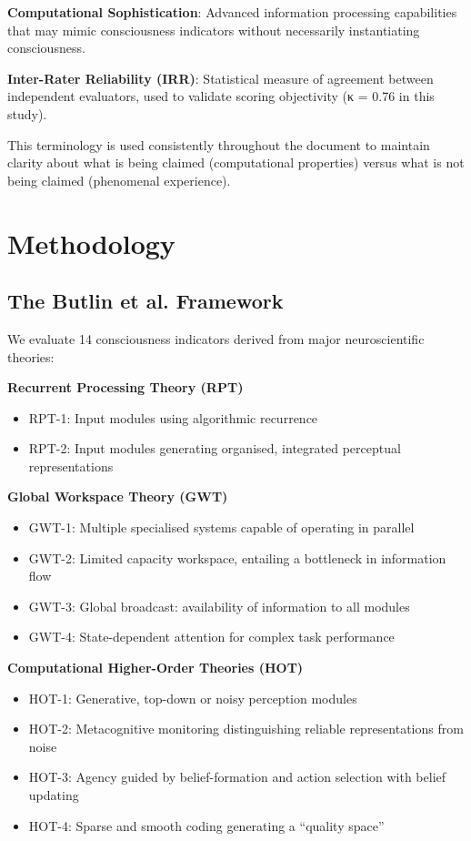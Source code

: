 \documentclass[12pt,a4paper]{article}
\begin{document}
\textbf{Computational Sophistication}: Advanced information processing capabilities that may mimic consciousness indicators without necessarily instantiating consciousness.

\textbf{Inter-Rater Reliability (IRR)}: Statistical measure of agreement between independent evaluators, used to validate scoring objectivity (κ = 0.76 in this study).

This terminology is used consistently throughout the document to maintain clarity about what is being claimed (computational properties) versus what is not being claimed (phenomenal experience).

\section{Methodology}

\subsection{The Butlin et al. Framework}

We evaluate 14 consciousness indicators derived from major neuroscientific theories:

\textbf{Recurrent Processing Theory (RPT)}
\begin{itemize}
    \item RPT-1: Input modules using algorithmic recurrence
    \item RPT-2: Input modules generating organised, integrated perceptual representations
\end{itemize}

\textbf{Global Workspace Theory (GWT)}
\begin{itemize}
    \item GWT-1: Multiple specialised systems capable of operating in parallel
    \item GWT-2: Limited capacity workspace, entailing a bottleneck in information flow
    \item GWT-3: Global broadcast: availability of information to all modules
    \item GWT-4: State-dependent attention for complex task performance
\end{itemize}

\textbf{Computational Higher-Order Theories (HOT)}
\begin{itemize}
    \item HOT-1: Generative, top-down or noisy perception modules
    \item HOT-2: Metacognitive monitoring distinguishing reliable representations from noise
    \item HOT-3: Agency guided by belief-formation and action selection with belief updating
    \item HOT-4: Sparse and smooth coding generating a ``quality space''
\end{itemize}
\end{document}

